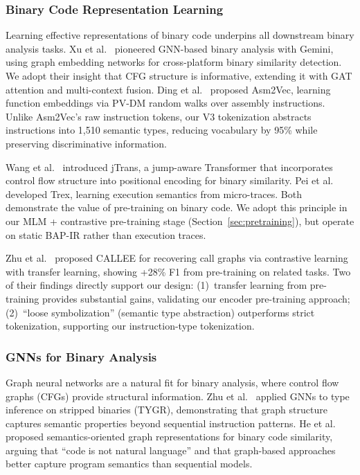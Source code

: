 \documentclass[sigconf,nonacm]{acmart}
\begin{document}
\subsubsection{Binary Code Representation Learning}

Learning effective representations of binary code underpins all downstream binary analysis tasks. Xu et al.~\cite{gemini} pioneered GNN-based binary analysis with Gemini, using graph embedding networks for cross-platform binary similarity detection. We adopt their insight that CFG structure is informative, extending it with GAT attention and multi-context fusion. Ding et al.~\cite{asm2vec} proposed Asm2Vec, learning function embeddings via PV-DM random walks over assembly instructions. Unlike Asm2Vec's raw instruction tokens, our V3 tokenization abstracts instructions into 1,510 semantic types, reducing vocabulary by 95\% while preserving discriminative information.

Wang et al.~\cite{jtrans} introduced jTrans, a jump-aware Transformer that incorporates control flow structure into positional encoding for binary similarity. Pei et al.~\cite{trex} developed Trex, learning execution semantics from micro-traces. Both demonstrate the value of pre-training on binary code. We adopt this principle in our MLM + contrastive pre-training stage (Section~\ref{sec:pretraining}), but operate on static BAP-IR rather than execution traces.

Zhu et al.~\cite{callee} proposed CALLEE for recovering call graphs via contrastive learning with transfer learning, showing +28\% F1 from pre-training on related tasks. Two of their findings directly support our design: (1)~transfer learning from pre-training provides substantial gains, validating our encoder pre-training approach; (2)~``loose symbolization'' (semantic type abstraction) outperforms strict tokenization, supporting our instruction-type tokenization.

\subsubsection{GNNs for Binary Analysis}

Graph neural networks are a natural fit for binary analysis, where control flow graphs (CFGs) provide structural information. Zhu et al.~\cite{tygr} applied GNNs to type inference on stripped binaries (TYGR), demonstrating that graph structure captures semantic properties beyond sequential instruction patterns. He et al.~\cite{codenl} proposed semantics-oriented graph representations for binary code similarity, arguing that ``code is not natural language'' and that graph-based approaches better capture program semantics than sequential models.
\end{document}
